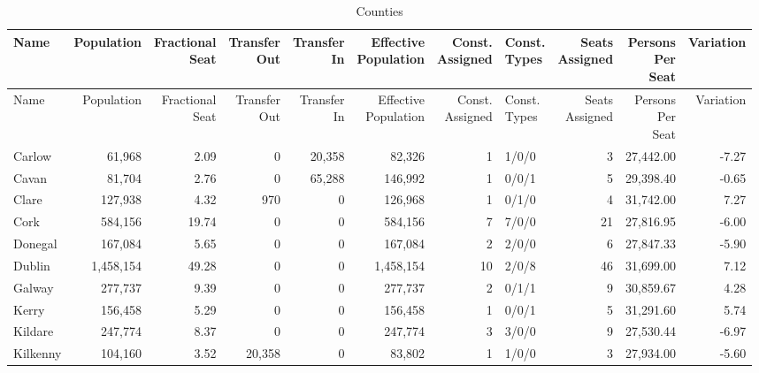 \documentclass[a4paper]{article}
\begin{document}
\begin{longtable}{lrrrrrrlrrr}
\caption{Counties}
\\ \toprule
Name &Population &\shortstack{Fractional\\Seat} &\shortstack{Transfer\\Out} &\shortstack{Transfer\\In} &\shortstack{Effective\\Population} &\shortstack{Const.\\Assigned} &\shortstack{Const.\\Types} &\shortstack{Seats\\Assigned} &\shortstack{Persons\\Per\\Seat} &Variation \\ \midrule
\endfirsthead
\toprule
Name &Population &\shortstack{Fractional\\Seat} &\shortstack{Transfer\\Out} &\shortstack{Transfer\\In} &\shortstack{Effective\\Population} &\shortstack{Const.\\Assigned} &\shortstack{Const.\\Types} &\shortstack{Seats\\Assigned} &\shortstack{Persons\\Per\\Seat} &Variation \\ \midrule
\endhead
\bottomrule
\endfoot
Carlow&61,968& 2.09&0&20,358&82,326&1&1/0/0&3&27,442.00&-7.27\\ 
Cavan&81,704& 2.76&0&65,288&146,992&1&0/0/1&5&29,398.40&-0.65\\ 
Clare&127,938& 4.32&970&0&126,968&1&0/1/0&4&31,742.00& 7.27\\ 
Cork&584,156&19.74&0&0&584,156&7&7/0/0&21&27,816.95&-6.00\\ 
Donegal&167,084& 5.65&0&0&167,084&2&2/0/0&6&27,847.33&-5.90\\ 
Dublin&1,458,154&49.28&0&0&1,458,154&10&2/0/8&46&31,699.00& 7.12\\ 
Galway&277,737& 9.39&0&0&277,737&2&0/1/1&9&30,859.67& 4.28\\ 
Kerry&156,458& 5.29&0&0&156,458&1&0/0/1&5&31,291.60& 5.74\\ 
Kildare&247,774& 8.37&0&0&247,774&3&3/0/0&9&27,530.44&-6.97\\ 
Kilkenny&104,160& 3.52&20,358&0&83,802&1&1/0/0&3&27,934.00&-5.60\\ 

\end{longtable}
\end{document}
